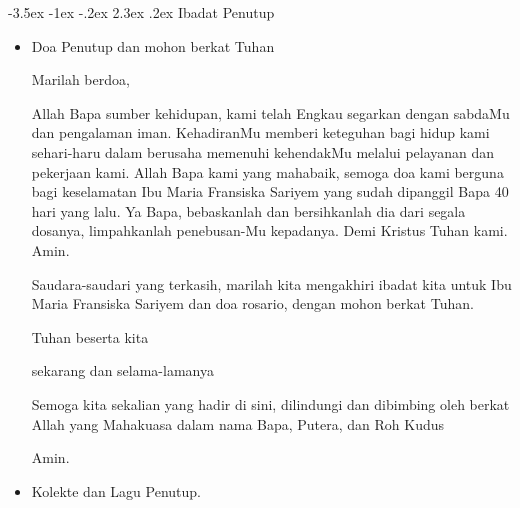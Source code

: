 \documentclass[a5paper,titlepage,12pt]{scrbook}
\makeatletter
\renewcommand{\section}{\@startsection {section}{1}{\z@}%
                                   {-3.5ex \@plus -1ex \@minus -.2ex}%
                                   {2.3ex \@plus.2ex}%
                                   {\normalfont\normalsize\bfseries}}
\newcommand{\arwah}{Ibu Maria Fransiska Sariyem }
\makeatother
\begin{document}
\section{Ibadat Penutup}
\begin{itemize}
\item Doa Penutup dan mohon berkat Tuhan

	Marilah berdoa,

Allah Bapa sumber kehidupan, kami telah Engkau segarkan dengan sabdaMu dan pengalaman iman. KehadiranMu memberi keteguhan bagi hidup kami sehari-haru dalam berusaha memenuhi kehendakMu melalui pelayanan dan  pekerjaan kami. Allah Bapa kami yang mahabaik, semoga doa kami berguna bagi keselamatan  \arwah yang sudah
dipanggil Bapa 40 hari yang lalu. Ya Bapa, bebaskanlah dan bersihkanlah dia dari segala dosanya, limpahkanlah penebusan-Mu kepadanya. Demi Kristus Tuhan kami. 
Amin.

Saudara-saudari yang terkasih, marilah kita mengakhiri ibadat kita untuk \arwah dan doa rosario, dengan mohon berkat Tuhan.

Tuhan beserta kita

sekarang dan selama-lamanya

Semoga kita sekalian yang hadir di sini, dilindungi dan dibimbing oleh berkat Allah yang Mahakuasa dalam nama Bapa, Putera, dan Roh Kudus

Amin.

\item Kolekte dan Lagu Penutup. 
\end{itemize}
\end{document}
